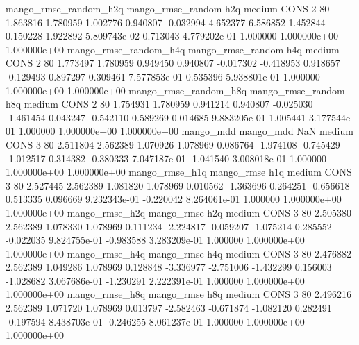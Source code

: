 mango_rmse_random_h2q mango_rmse_random                  h2q     medium     CONS                 2 80  1.863816       1.780959 1.002776       0.940807   -0.032994      4.652377      6.586852     1.452844       0.150228  1.922892 5.809743e-02     0.713043   4.779202e-01            1.000000    1.000000e+00        1.000000e+00
mango_rmse_random_h4q mango_rmse_random                  h4q     medium     CONS                 2 80  1.773497       1.780959 0.949450       0.940807   -0.017302     -0.418953      0.918657    -0.129493       0.897297  0.309461 7.577853e-01     0.535396   5.938801e-01            1.000000    1.000000e+00        1.000000e+00
mango_rmse_random_h8q mango_rmse_random                  h8q     medium     CONS                 2 80  1.754931       1.780959 0.941214       0.940807   -0.025030     -1.461454      0.043247    -0.542110       0.589269  0.014685 9.883205e-01     1.005441   3.177544e-01            1.000000    1.000000e+00        1.000000e+00
            mango_mdd         mango_mdd                  NaN     medium     CONS                 3 80  2.511804       2.562389 1.070926       1.078969    0.086764     -1.974108     -0.745429    -1.012517       0.314382 -0.380333 7.047187e-01    -1.041540   3.008018e-01            1.000000    1.000000e+00        1.000000e+00
       mango_rmse_h1q        mango_rmse                  h1q     medium     CONS                 3 80  2.527445       2.562389 1.081820       1.078969    0.010562     -1.363696      0.264251    -0.656618       0.513335  0.096669 9.232343e-01    -0.220042   8.264061e-01            1.000000    1.000000e+00        1.000000e+00
       mango_rmse_h2q        mango_rmse                  h2q     medium     CONS                 3 80  2.505380       2.562389 1.078330       1.078969    0.111234     -2.224817     -0.059207    -1.075214       0.285552 -0.022035 9.824755e-01    -0.983588   3.283209e-01            1.000000    1.000000e+00        1.000000e+00
       mango_rmse_h4q        mango_rmse                  h4q     medium     CONS                 3 80  2.476882       2.562389 1.049286       1.078969    0.128848     -3.336977     -2.751006    -1.432299       0.156003 -1.028682 3.067686e-01    -1.230291   2.222391e-01            1.000000    1.000000e+00        1.000000e+00
       mango_rmse_h8q        mango_rmse                  h8q     medium     CONS                 3 80  2.496216       2.562389 1.071720       1.078969    0.013797     -2.582463     -0.671874    -1.082120       0.282491 -0.197594 8.438703e-01    -0.246255   8.061237e-01            1.000000    1.000000e+00        1.000000e+00
